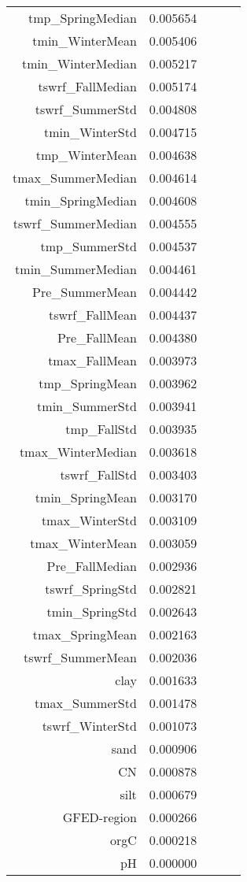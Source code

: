 \begin{table}[h]
\begin{tabular}{rrrrr}
tmp_SpringMedian & 0.005654 \\
tmin_WinterMean & 0.005406 \\
tmin_WinterMedian & 0.005217 \\
tswrf_FallMedian & 0.005174 \\
tswrf_SummerStd & 0.004808 \\
tmin_WinterStd & 0.004715 \\
tmp_WinterMean & 0.004638 \\
tmax_SummerMedian & 0.004614 \\
tmin_SpringMedian & 0.004608 \\
tswrf_SummerMedian & 0.004555 \\
tmp_SummerStd & 0.004537 \\
tmin_SummerMedian & 0.004461 \\
Pre_SummerMean & 0.004442 \\
tswrf_FallMean & 0.004437 \\
Pre_FallMean & 0.004380 \\
tmax_FallMean & 0.003973 \\
tmp_SpringMean & 0.003962 \\
tmin_SummerStd & 0.003941 \\
tmp_FallStd & 0.003935 \\
tmax_WinterMedian & 0.003618 \\
tswrf_FallStd & 0.003403 \\
tmin_SpringMean & 0.003170 \\
tmax_WinterStd & 0.003109 \\
tmax_WinterMean & 0.003059 \\
Pre_FallMedian & 0.002936 \\
tswrf_SpringStd & 0.002821 \\
tmin_SpringStd & 0.002643 \\
tmax_SpringMean & 0.002163 \\
tswrf_SummerMean & 0.002036 \\
clay & 0.001633 \\
tmax_SummerStd & 0.001478 \\
tswrf_WinterStd & 0.001073 \\
sand & 0.000906 \\
CN & 0.000878 \\
silt & 0.000679 \\
GFED-region & 0.000266 \\
orgC & 0.000218 \\
pH & 0.000000 \\
\bottomrule
\end{tabular}
\end{table}
